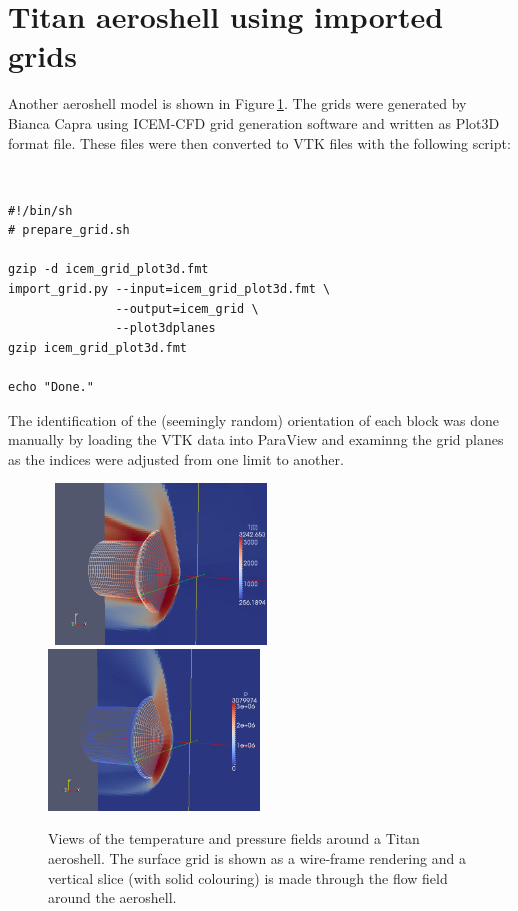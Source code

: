 \section{Titan aeroshell using imported grids}
\label{titan-aeroshell-sec}
%
Another aeroshell model is shown in Figure\,\ref{bianca-aeroshell-fig}.
The grids were generated by Bianca Capra using ICEM-CFD grid generation
software and written as Plot3D format file.
These files were then converted to VTK files with the following script:

\noindent
\baselineskip=1.0pc
\topbar\\
\begin{verbatim}
#!/bin/sh
# prepare_grid.sh

gzip -d icem_grid_plot3d.fmt
import_grid.py --input=icem_grid_plot3d.fmt \
               --output=icem_grid \
               --plot3dplanes
gzip icem_grid_plot3d.fmt

echo "Done."
\end{verbatim}
\bottombar

\baselineskip=1.5pc
\medskip
The identification of the (seemingly random) orientation of each block
was done manually by loading the VTK data into ParaView and examinng the grid
planes as the indices were adjusted from one limit to another.


\begin{figure}[htbp]
\mbox{
\includegraphics[width=0.5\textwidth]{../3D/bianca-epfl/titan-T-field-with-surface-mesh.png}
\includegraphics[width=0.5\textwidth]{../3D/bianca-epfl/titan-p-field-with-surface-mesh.png}
}
\caption{Views of the temperature and pressure fields around a Titan aeroshell.
  The surface grid is shown as a wire-frame rendering and a vertical slice (with solid colouring)
  is made through the flow field around the aeroshell.}
\label{bianca-aeroshell-fig}
\end{figure}


